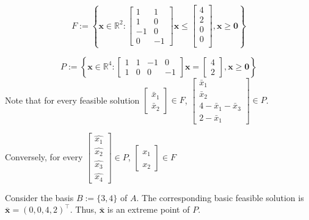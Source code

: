 \[ F:=\left\{ \bm{x}\in\mathbb{R}^2: \begin{bmatrix}
        1  & 1  \\
        1  & 0  \\
        -1 & 0  \\
        0  & -1
    \end{bmatrix}\bm{x}\le
    \begin{bmatrix}
        4 \\
        2 \\
        0 \\
        0 \\
    \end{bmatrix}, \bm{x}\geqslant  \bm{0} \right\} \]

\[ P:=\left\{\bm{x}\in\mathbb{R}^4:
    \begin{bmatrix}
        1 & 1 & -1 & 0  \\
        1 & 0 & 0  & -1
    \end{bmatrix}\bm{x}=
    \begin{bmatrix}
        4 \\
        2
    \end{bmatrix}, \bm{x}\geqslant  \bm{0}\right\} \]
Note that for every feasible solution
$ \begin{bmatrix}
        \bar{x}_1 \\
        \bar{x}_2
    \end{bmatrix}\in F $,
$ \begin{bmatrix}
        \bar{x}_1             \\
        \bar{x}_2             \\
        4-\bar{x}_1-\bar{x}_3 \\
        2-\bar{x}_1
    \end{bmatrix}\in P $.

Conversely, for every
$ \begin{bmatrix}
        \hat{x_1} \\
        \hat{x_2} \\
        \hat{x_3} \\
        \hat{x_4}
    \end{bmatrix}\in P $,
$ \begin{bmatrix}
        \hat{x_1} \\
        \hat{x_2}
    \end{bmatrix}\in F $

Consider the basis $ B:=\{3,4\} $ of $ A $. The corresponding basic feasible
solution is $ \bm{\bar{x}}=(0,0,4,2)^\top $. Thus, $ \bm{\bar{x}} $ is
an extreme point of $ P $.

